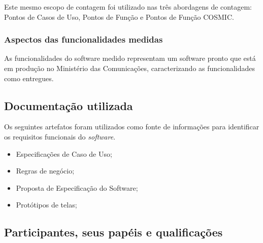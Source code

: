       Este mesmo escopo de contagem foi utilizado nas três abordagens de contagem: Pontos de Casos de Uso, Pontos de Função e Pontos de Função COSMIC.
      
      \subsubsection{Aspectos das funcionalidades medidas}
	  
	  As funcionalidades do software medido representam um software pronto que está em produção no Ministério das Comunicações,
	  caracterizando as funcionalidades como entregues.
      
    \subsection{Documentação utilizada}
	
	Os seguintes artefatos foram utilizados como fonte de informações para identificar os requisitos funcionais do \textit{software}.
	
	\begin{itemize}
	  \item Especificações de Caso de Uso;
	  \item Regras de negócio;
	  \item Proposta de Especificação do Software;
	  \item Protótipos de telas;
	\end{itemize}
	
    \subsection{Participantes, seus papéis e qualificações}
